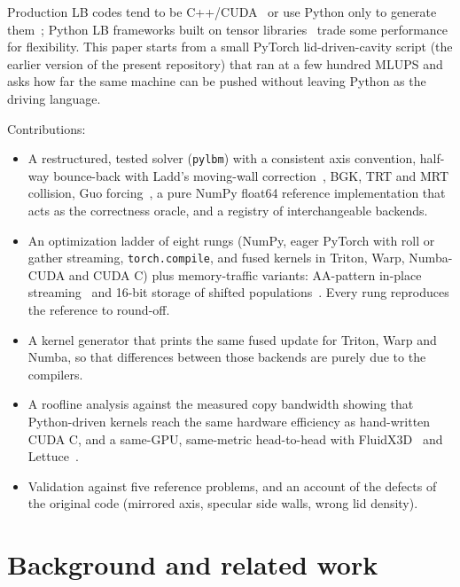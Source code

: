 \documentclass[11pt]{article}
\begin{document}
Production LB codes tend to be C++/CUDA~\citep{bauer2021walberla} or use Python only to
generate them~\citep{bauer2021lbmpy}; Python LB frameworks built on tensor
libraries~\citep{bedrunka2021,ataei2024} trade some performance for flexibility. This paper
starts from a small PyTorch lid-driven-cavity script (the earlier version of the present
repository) that ran at a few hundred MLUPS and asks how far the same machine can be pushed
without leaving Python as the driving language.

Contributions:
\begin{itemize}
\item A restructured, tested solver (\texttt{pylbm}) with a consistent axis convention,
half-way bounce-back with Ladd's moving-wall correction~\citep{ladd1994}, BGK, TRT and MRT
collision, Guo forcing~\citep{guo2002}, a pure NumPy float64 reference implementation that
acts as the correctness oracle, and a registry of interchangeable backends.
\item An optimization ladder of eight rungs (NumPy, eager PyTorch with roll or gather
streaming, \texttt{torch.compile}, and fused kernels in Triton, Warp, Numba-CUDA and CUDA C)
plus memory-traffic variants: AA-pattern in-place streaming~\citep{bailey2009} and 16-bit
storage of shifted populations~\citep{lehmann2022}. Every rung reproduces the reference to
round-off.
\item A kernel generator that prints the same fused update for Triton, Warp and Numba, so
that differences between those backends are purely due to the compilers.
\item A roofline analysis against the measured copy bandwidth showing that Python-driven
kernels reach the same hardware efficiency as hand-written CUDA C, and a same-GPU,
same-metric head-to-head with FluidX3D~\citep{lehmann2022} and Lettuce~\citep{bedrunka2021}.
\item Validation against five reference problems, and an account of the defects of the
original code (mirrored axis, specular side walls, wrong lid density).
\end{itemize}

\section{Background and related work}
\end{document}
